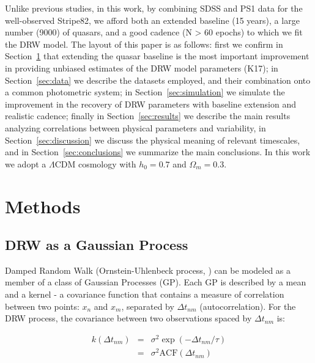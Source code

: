 \documentclass[twocolumn]{aastex62}
\begin{document}

 Unlike previous studies, in this work, by combining SDSS and PS1 data for the well-observed Stripe82, we afford both an extended baseline (15 years), a large number (9000) of quasars, and  a good cadence (N > 60 epochs) to which we fit the DRW model. The layout of this paper is as follows: first we confirm in Section~\ref{sec:methods} that extending the quasar baseline is the most important improvement in providing unbiased estimates of the DRW model parameters (K17);  in Section~\ref{sec:data} we describe the datasets employed, and their combination onto a common photometric system;  in Section~\ref{sec:simulation} we simulate the improvement in the recovery of DRW parameters with baseline extension and realistic cadence; finally in Section~\ref{sec:results} we describe the main results analyzing correlations between physical parameters and variability, in Section~\ref{sec:discussion} we discuss the physical meaning of relevant timescales, and in Section~\ref{sec:conclusions} we summarize the main conclusions. In this work we adopt a $\Lambda $CDM cosmology with $h_{0} = 0.7$ and $\Omega_{m} = 0.3 $. 
%
%
%
%
\section{Methods}
\label{sec:methods}
\subsection{DRW as a Gaussian Process}
Damped Random Walk (Ornstein-Uhlenbeck process, \citealt{rasmussen2006}) can be modeled as a member of a class of Gaussian Processes (GP). Each GP is described by a mean and a kernel - a covariance function that contains a measure of correlation between two points: $x_{n}$ and $x_{m}$, separated by $\Delta t_{nm}$ (autocorrelation). For the  DRW process, the covariance  between two observations spaced by  $\Delta t_{nm}$ is: 

\begin{eqnarray}
k(\Delta t_{nm}) &=& \sigma^{2}\exp{(-\Delta t_{nm} / \tau)}  \nonumber \\
                 &=& \sigma^{2} \mathrm{ACF}(\Delta t_{nm})\nonumber
\end{eqnarray} 
\end{document}

